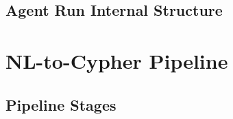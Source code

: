 \documentclass[a4paper,twoside]{sapthesis}
\begin{document}
\subsection{Agent Run Internal Structure}
%
%
%
%
%

\section{NL-to-Cypher Pipeline}
\label{sec:nl-cypher}

\subsection{Pipeline Stages}
%
%
%
%
%
\end{document}
